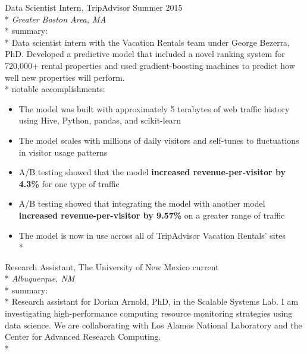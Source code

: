 \documentclass[print]{friggeri-cv} %
\begin{document}
\iftoggle{cv}{
\section{research/work experience}
}{
\section{selected research/work experience}
}
\begin{description} \itemsep1pt \parskip0pt 
  \item {\largeheaderfont Data Scientist Intern, TripAdvisor} \hfill
    {\smallheaderfont Summer 2015}\\*
    {\footnotesize \emph{Greater Boston Area, MA}} \\*
    {\smallheaderfont summary}: \\*
    Data scientist intern with the Vacation Rentals team under George Bezerra, PhD.
    Developed a predictive model that included a novel ranking system for
    720,000+ rental properties and used gradient-boosting machines to predict
    how well new properties will perform. \\*
    {\smallheaderfont notable accomplishments}:
    \begin{itemize} \itemsep1pt \parskip1pt 
      \item The model was built with approximately 5 terabytes of web traffic
            history using Hive, Python, pandas, and scikit-learn
      \item The model scales with millions of daily visitors and self-tunes to
            fluctuations in visitor usage patterns
      \item A/B testing showed that the model \textbf{increased revenue-per-visitor by
            4.3\%} for one type of traffic
      \item A/B testing showed that integrating the model with another model
            \textbf{increased revenue-per-visitor by 9.57\%} on a greater range of
            traffic
      \item The model is now in use across all of TripAdvisor Vacation Rentals' sites\\*
    \end{itemize}

  \item {\largeheaderfont Research Assistant, The University of New Mexico} \hfill
    {\textemdash current}\\*
    {\footnotesize \emph{Albuquerque, NM }} \\*
    {\smallheaderfont summary}: \\*
    Research assistant for Dorian Arnold, PhD, in the Scalable Systems Lab.  I
    am investigating high-performance computing resource monitoring strategies
    using data science. We are collaborating with Los Alamos National
    Laboratory and the Center for Advanced Research Computing. \\*


\end{description}
\end{document}
